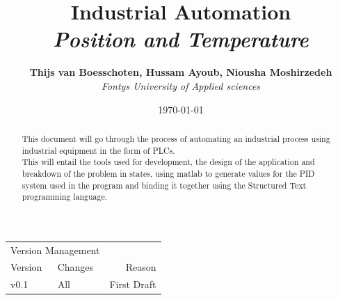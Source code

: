 \documentclass[11pt]{essayStyle} %
\title{\textbf{Industrial Automation} \\ {\Large\itshape Position and Temperature}} %
\author{\textbf{Thijs van Boesschoten, Hussam Ayoub, Niousha Moshirzedeh} \\ \textit{Fontys University of Applied sciences}} %
\date{\today} %
\begin{document}
\maketitle %



\begin{abstract}
This document will go through the process of automating an industrial process using industrial equipment in the form of PLCs.\\
This will entail the tools used for development, the design of the application and breakdown of the problem in states, using matlab to generate values for the PID system used in the program and binding it together using the Structured Text programming language.
\end{abstract}

\vspace{30pt} %


\begin{table}[h] %
	\centering
	\begin{tabular}{l l r}
		\multicolumn{2}{c}{Version Management} \\
		\cmidrule(r){1-3}
		Version & Changes & Reason \\
		\midrule
		v0.1 & All & First Draft \\
		\bottomrule
	\end{tabular}
\end{table}


\tableofcontents

\pagebreak
\end{document}
